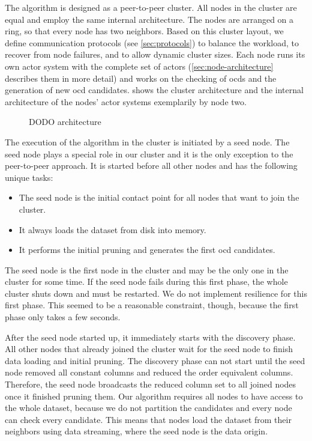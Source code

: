   The \dodo{} algorithm is designed as a peer-to-peer cluster.
  All nodes in the cluster are equal and employ the same internal architecture.
  The nodes are arranged on a ring, so that every node has two neighbors.
  Based on this cluster layout, we define communication protocols (see \cref{sec:protocols}) to balance the workload, to recover from node failures, and to allow dynamic cluster sizes.
  Each node runs its own actor system with the complete set of \dodo{} actors (\cref{sec:node-architecture} describes them in more detail) and works on the checking of \glspl{ocd} and the generation of new \gls{ocd} candidates.
   shows the cluster architecture and the internal architecture of the nodes' actor systems exemplarily by node two.

  \begin{figure}
    \centering
    
    \caption{DODO architecture}
    \label{fig:dodo-architecture}
  \end{figure}

  The execution of the \dodo{} algorithm in the cluster is initiated by a seed node.
  The seed node plays a special role in our cluster and it is the only exception to the peer-to-peer approach.
  It is started before all other nodes and has the following unique tasks:

  \begin{itemize}
    \item The seed node is the initial contact point for all nodes that want to join the cluster.
    \item It always loads the dataset from disk into memory.
    \item It performs the initial pruning and generates the first \gls{ocd} candidates.
  \end{itemize}

  The seed node is the first node in the cluster and may be the only one in the cluster for some time.
  If the seed node fails during this first phase, the whole cluster shuts down and must be restarted.
  We do not implement resilience for this first phase.
  This seemed to be a reasonable constraint, though, because the first phase only takes a few seconds.

  After the seed node started up, it immediately starts with the discovery phase.
  All other nodes that already joined the cluster wait for the seed node to finish data loading and initial pruning.
  The discovery phase can not start until the seed node removed all constant columns and reduced the order equivalent columns.
  Therefore, the seed node broadcasts the reduced column set to all joined nodes once it finished pruning them.
  Our algorithm requires all nodes to have access to the whole dataset, because we do not partition the candidates and every node can check every candidate.
  This means that nodes load the dataset from their neighbors using data streaming, where the seed node is the data origin.

